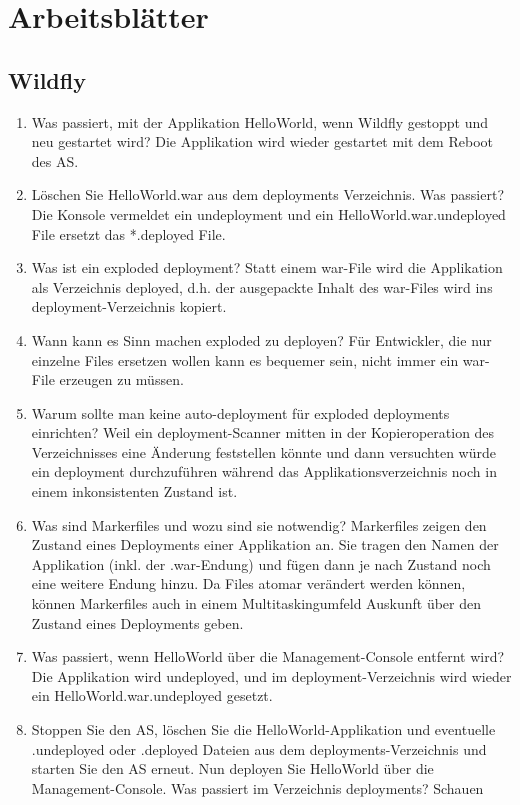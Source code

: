 \documentclass[a4paper,10pt]{scrreprt}
\begin{document}
\part{Arbeitsblätter}
\chapter{Wildfly} %
\label{cha:wildfly}
\begin{enumerate}
	\item Was passiert, mit der Applikation HelloWorld, wenn Wildfly gestoppt und neu gestartet wird?
Die Applikation wird wieder gestartet mit dem Reboot des AS.
\item Löschen Sie HelloWorld.war aus dem deployments Verzeichnis. Was passiert?
Die Konsole vermeldet ein undeployment und ein HelloWorld.war.undeployed File ersetzt das
*.deployed File.
\item Was ist ein exploded deployment?
Statt einem war-File wird die Applikation als Verzeichnis deployed, d.h. der ausgepackte
Inhalt des war-Files wird ins deployment-Verzeichnis kopiert.
\item Wann kann es Sinn machen exploded zu deployen?
Für Entwickler, die nur einzelne Files ersetzen wollen kann es bequemer sein, nicht immer
ein war-File erzeugen zu müssen.
\item Warum sollte man keine auto-deployment für exploded deployments einrichten?
Weil ein deployment-Scanner mitten in der Kopieroperation des Verzeichnisses eine
Änderung feststellen könnte und dann versuchten würde ein deployment durchzuführen
während das Applikationsverzeichnis noch in einem inkonsistenten Zustand ist.
\item Was sind Markerfiles und wozu sind sie notwendig?
Markerfiles zeigen den Zustand eines Deployments einer Applikation an. Sie tragen den
Namen der Applikation (inkl. der .war-Endung) und fügen dann je nach Zustand noch eine
weitere Endung hinzu.
Da Files atomar verändert werden können, können Markerfiles auch in einem
Multitaskingumfeld Auskunft über den Zustand eines Deployments geben.
\item Was passiert, wenn HelloWorld über die Management-Console entfernt wird?
Die Applikation wird undeployed, und im deployment-Verzeichnis wird wieder ein
HelloWorld.war.undeployed gesetzt.
\item Stoppen Sie den AS, löschen Sie die HelloWorld-Applikation und eventuelle .undeployed oder
.deployed Dateien aus dem deployments-Verzeichnis und starten Sie den AS erneut. Nun deployen
Sie HelloWorld über die Management-Console. Was passiert im Verzeichnis deployments? Schauen

\end{enumerate}
\end{document}
